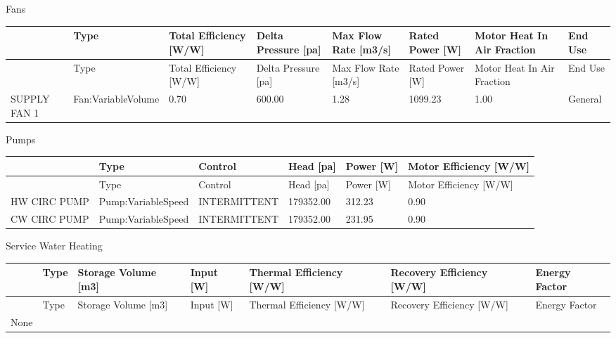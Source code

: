 Fans

{\scriptsize
\begin{longtable}[c]{>{\raggedright}p{0.75in}>{\raggedright}p{0.75in}>{\raggedright}p{0.75in}>{\raggedright}p{0.75in}>{\raggedright}p{0.75in}>{\raggedright}p{0.75in}>{\raggedright}p{0.75in}>{\raggedright}p{0.75in}}
\toprule
~ & Type & Total Efficiency [W/W] & Delta Pressure [pa] & Max Flow Rate [m3/s] & Rated Power [W] & Motor Heat In Air Fraction & End Use \tabularnewline
\midrule
\endfirsthead

\toprule
~ & Type & Total Efficiency [W/W] & Delta Pressure [pa] & Max Flow Rate [m3/s] & Rated Power [W] & Motor Heat In Air Fraction & End Use \tabularnewline
\midrule
\endhead

SUPPLY FAN 1 & Fan:VariableVolume & 0.70 & 600.00 & 1.28 & 1099.23 & 1.00 & General \tabularnewline
\bottomrule
\end{longtable}}

Pumps

{\scriptsize
\begin{longtable}[c]{>{\raggedright}p{1.0in}>{\raggedright}p{1.0in}>{\raggedright}p{1.0in}>{\raggedright}p{1.0in}>{\raggedright}p{1.0in}>{\raggedright}p{1.0in}}
\toprule
~ & Type & Control & Head [pa] & Power [W] & Motor Efficiency [W/W] \tabularnewline
\midrule
\endfirsthead

\toprule
~ & Type & Control & Head [pa] & Power [W] & Motor Efficiency [W/W] \tabularnewline
\midrule
\endhead

HW CIRC PUMP & Pump:VariableSpeed & INTERMITTENT & 179352.00 & 312.23 & 0.90 \tabularnewline
CW CIRC PUMP & Pump:VariableSpeed & INTERMITTENT & 179352.00 & 231.95 & 0.90 \tabularnewline
\bottomrule
\end{longtable}}

Service Water Heating

\begin{longtable}[c]{>{\raggedright}p{0.85in}>{\raggedright}p{0.85in}>{\raggedright}p{0.85in}>{\raggedright}p{0.85in}>{\raggedright}p{0.85in}>{\raggedright}p{0.85in}>{\raggedright}p{0.85in}}
\toprule
~ & Type & Storage Volume [m3] & Input [W] & Thermal Efficiency [W/W] & Recovery Efficiency [W/W] & Energy Factor \tabularnewline
\midrule
\endfirsthead

\toprule
~ & Type & Storage Volume [m3] & Input [W] & Thermal Efficiency [W/W] & Recovery Efficiency [W/W] & Energy Factor \tabularnewline
\midrule
\endhead

None & ~ & ~ & ~ & ~ & ~ & ~ \tabularnewline
\bottomrule
\end{longtable}
